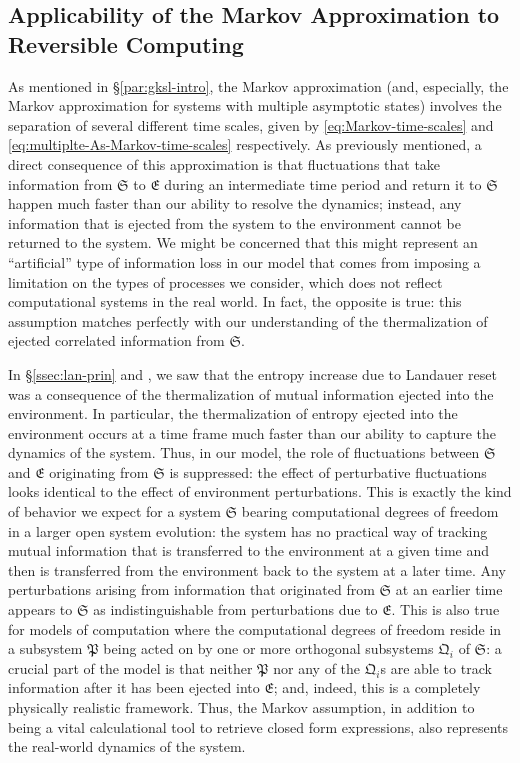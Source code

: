 \documentclass[preprints,article,accept,moreauthors,pdftex]{Definitions/mdpi}
\begin{document}
\begin{paracol}{2}
\subsection{Applicability of the Markov Approximation to Reversible Computing}
\label{ssec:markov-rc}

As mentioned in \S\ref{par:gksl-intro}, the Markov approximation (and, especially, the Markov approximation for systems with multiple asymptotic states) involves the separation of several different time scales, given by \eqref{eq:Markov-time-scales} and \eqref{eq:multiplte-As-Markov-time-scales} respectively. As previously mentioned, a direct consequence of this approximation is that fluctuations that take information from $\mathfrak{S}$ to $\mathfrak{E}$ during an intermediate time period and return it to $\mathfrak{S}$ happen much faster than our ability to resolve the dynamics; instead, any information that is ejected from the system to the environment cannot be returned to the system. We might be concerned that this might represent an ``artificial'' type of information loss in our model that comes from imposing a limitation on the types of processes we consider, which does not reflect computational systems in the real world. In fact, the opposite is true: this assumption matches perfectly with our understanding of the thermalization of ejected correlated information from $\mathfrak{S}$.

In \S\ref{ssec:lan-prin} and \cite{Fra18}, we saw that the entropy increase due to Landauer reset was a consequence of the thermalization of mutual information ejected into the environment. In particular, the thermalization of entropy ejected into the environment occurs at a time frame much faster than our ability to capture the dynamics of the system. Thus, in our model, the role of fluctuations between $\mathfrak{S}$ and $\mathfrak{E}$ originating from $\mathfrak{S}$ is suppressed: the effect of perturbative fluctuations looks identical to the effect of environment perturbations. This is exactly the kind of behavior we expect for a system $\mathfrak{S}$ bearing computational degrees of freedom in a larger open system evolution: the system has no practical way of tracking mutual information that is transferred to the environment at a given time and then is transferred from the environment back to the system at a later time. Any perturbations arising from information that originated from $\mathfrak{S}$ at an earlier time appears to $\mathfrak{S}$ as indistinguishable from perturbations due to $\mathfrak{E}$. This is also true for models of computation where the computational degrees of freedom reside in a subsystem $\mathfrak{P}$ being acted on by one or more orthogonal subsystems $\mathfrak{Q}_{i}$ of $\mathfrak{S}$: a crucial part of the model is that neither $\mathfrak{P}$ nor any of the $\mathfrak{Q}_{i}$s are able to track information after it has been ejected into $\mathfrak{E}$; and, indeed, this is a completely physically realistic framework. Thus, the Markov assumption, in addition to being a vital calculational tool to retrieve closed form expressions, also represents the real-world dynamics of the system.


\end{paracol}
\end{document}
